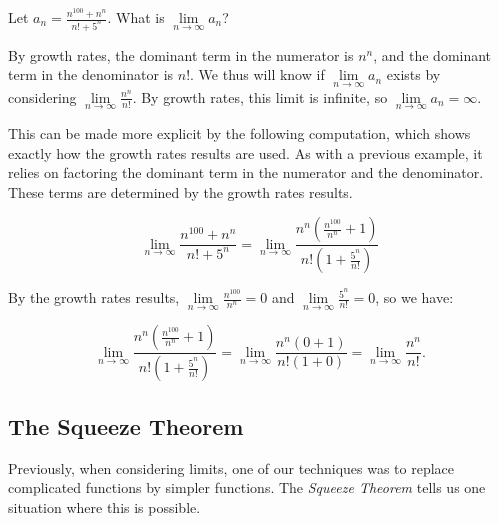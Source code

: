 \documentclass{ximera}
\begin{document}
\begin{example}
  Let $a_n  = \frac{n^{100} + n^n}{n!+5^n}$.  What is $\lim\limits_{n \to \infty} a_n$?
  
  \begin{explanation}
  By growth rates, the dominant term in the numerator is $n^n$, and the dominant term in the denominator is $n!$.  We thus will know if $\lim\limits_{n \to \infty} a_n$ exists by considering $\lim\limits_{n \to \infty} \frac{n^n}{n!}$.  By growth rates, this limit is infinite, so $\lim\limits_{n \to \infty} a_n = \infty$.
  
This can be made more explicit by the following computation, which shows exactly how the growth rates results are used.  As with a previous example, it relies on factoring the dominant term in the numerator and the denominator.  These terms are determined by the growth rates results.

\[
\lim\limits_{n \to \infty} \frac{n^{100} + n^n}{n!+5^n} = \lim\limits_{n \to \infty} \frac{n^n \left(\frac{n^{100}}{n^n} + 1\right)}{n!\left(1+\frac{5^n}{n!}\right)} 
\]

By the growth rates results, $\lim\limits_{n \to \infty} \frac{n^{100}}{n^n} =0$ and  $\lim\limits_{n \to \infty}\frac{5^n}{n!} =0$, so we have: 
  
 \[  \lim\limits_{n \to \infty} \frac{n^n \left(\frac{n^{100}}{n^n} + 1\right)}{n!\left(1+\frac{5^n}{n!}\right)} =   \lim\limits_{n \to \infty} \frac{n^n \left(0 + 1\right)}{n!\left(1+0\right)} = \lim\limits_{n \to \infty} \frac{n^n}{n!}.  \]
   
   
  \end{explanation}
\end{example}















\subsection*{The Squeeze Theorem}

%

Previously, when considering limits, one of our techniques was to replace 
complicated functions by simpler functions. The \textit{Squeeze Theorem}
tells us one situation where this is possible.
\end{document}
